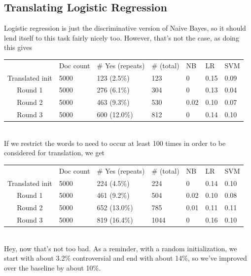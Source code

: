 \documentclass[11pt]{article} %
\begin{document}
\subsection{Translating Logistic Regression}

Logistic regression is just the discriminative version of Naive Bayes, so it should lend itself to this task fairly nicely too. However, that's not the case, as doing this gives \\

\begin{tabular}{|c|*{6}{l|}}
\rowcolor{gray!50} & Doc count & \# Yes (repeats) & \# (total) & NB & LR & SVM \\
Translated init & 5000 & 123 (2.5\%) & 123 & 0 &  0.15 & 0.09 \\
Round 1 & 5000 &  276 (6.1\%) & 304 &  0 & 0.13 & 0.04 \\
Round 2 & 5000 & 463 (9.3\%)& 530 & 0.02 & 0.10 & 0.07 \\
Round 3 & 5000 & 600 (12.0\%) & 812 & 0 & 0.14 & 0.10 \\
\end{tabular} \\
If we restrict the words to need to occur at least 100 times in order to be considered for translation, we get

\begin{tabular}{|c|*{6}{l|}}
\rowcolor{gray!50} & Doc count & \# Yes (repeats) & \# (total) & NB & LR & SVM \\
Translated init & 5000 & 224 (4.5\%) & 224 & 0 & 0.14 & 0.10 \\
Round 1 & 5000 &  461 (9.2\%) & 504 & 0.02 & 0.10 & 0.08 \\
Round 2 & 5000 &  652 (13.0\%) & 785 & 0.01 & 0.11 & 0.11 \\
Round 3 & 5000 &  819 (16.4\%) & 1044 & 0 & 0.16 & 0.10 \\
\end{tabular} \\
Hey, now that's not too bad. As a reminder, with a random initialization, we start with about 3.2\% controversial and end with about 14\%, so we've improved over the baseline by about 10\%. 
\end{document}
